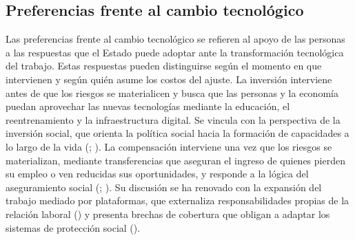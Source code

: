 \documentclass[
  spanish,
  12pt,
]{article}
\begin{document}
\subsection{Preferencias frente al cambio
tecnológico}\label{preferencias-frente-al-cambio-tecnoluxf3gico}

Las preferencias frente al cambio tecnológico se refieren al apoyo de
las personas a las respuestas que el Estado puede adoptar ante la
transformación tecnológica del trabajo. Estas respuestas pueden
distinguirse según el momento en que intervienen y según quién asume los
costos del ajuste. La inversión interviene antes de que los riesgos se
materialicen y busca que las personas y la economía puedan aprovechar
las nuevas tecnologías mediante la educación, el reentrenamiento y la
infraestructura digital. Se vincula con la perspectiva de la inversión
social, que orienta la política social hacia la formación de capacidades
a lo largo de la vida
(;
). La compensación
interviene una vez que los riesgos se materializan, mediante
transferencias que aseguran el ingreso de quienes pierden su empleo o
ven reducidas sus oportunidades, y responde a la lógica del
aseguramiento social (; ). Su
discusión se ha renovado con la expansión del trabajo mediado por
plataformas, que externaliza responsabilidades propias de la relación
laboral () y
presenta brechas de cobertura que obligan a adaptar los sistemas de
protección social ().
\end{document}
